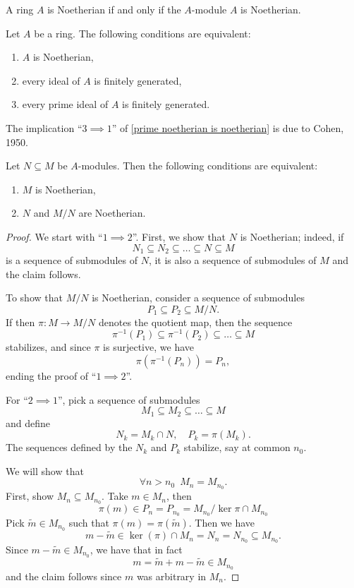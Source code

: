 \begin{df}
  A ring $A$ is Noetherian if and only if the $A$-module $A$ is Noetherian. 
\end{df}

\begin{prop}
  \label{prime noetherian is noetherian}
  Let $A$ be a ring. The following conditions are equivalent:
  \begin{enumerate}
  \item $A$ is Noetherian,
  \item every ideal of $A$ is finitely generated,
  \item every prime ideal of $A$ is finitely generated.
  \end{enumerate}
\end{prop}

The implication ``$3 \implies 1$'' of \cref{prime noetherian is noetherian} is due to Cohen, 1950.

\begin{prop}
  \label{noetherian-extensions}
  Let $N \subseteq M$ be $A$-modules. Then the following conditions are equivalent:
  \begin{enumerate}
  \item $M$ is Noetherian,
  \item $N$ and $M/{N}$ are Noetherian.
  \end{enumerate}
\end{prop}
\begin{proof}
  We start with ``$1 \implies 2$''. First, we show that $N$ is Noetherian; indeed, if
  \[ N_1 \subseteq N_2 \subseteq \ldots \subseteq N \subseteq M\]
  is a sequence of submodules of $N$, it is also a sequence of submodules of $M$ and the claim follows.

  To show that $M /{N}$ is Noetherian, consider a sequence of submodules
  \[ P_1 \subseteq P_2 \subseteq M /{N}.\]
  If then $\pi \colon M \to M /{N}$ denotes the quotient map, then the sequence
  \[ \pi^{-1}(P_1) \subseteq \pi^{-1}(P_2) \subseteq \ldots \subseteq M\]
  stabilizes, and since $\pi$ is surjective, we have
  \[ \pi(\pi^{-1}(P_n)) = P_n,\]
  ending the proof of ``$1 \implies 2$''.

  For ``$2 \implies 1$'', pick a sequence of submodules
  \[M_1 \subseteq M_2 \subseteq \ldots \subseteq M\]
  and define
  \[ N_k = M_k \cap N, \quad P_k = \pi(M_k).\]
  The sequences defined by the $N_k$ and $P_k$ stabilize, say at common $n_0$.

  We will show that
  \[ \forall n > n_0 \enspace M_n = M_{n_0}.\]
  First, show $M_n \subseteq M_{n_0}$. Take $m \in M_n$, then
  \[ \pi(m) \in P_n = P_{n_0} = M_{n_0} / {\ker \pi \cap M_{n_0}}\]
  Pick $\tilde m \in M_{n_0}$ such that $\pi(m) = \pi(\tilde m)$.
  Then we have
  \[ m - \tilde{m} \in \ker(\pi) \cap M_n = N_n = N_{n_0} \subseteq M_{n_0}.\]
  Since $m-\tilde{m} \in M_{n_0}$, we have that
  in fact
  \[ m = \tilde{m} + m - \tilde{m} \in M_{n_0}\]
  and the claim follows since $m$ was arbitrary in $M_n$.
\end{proof}


